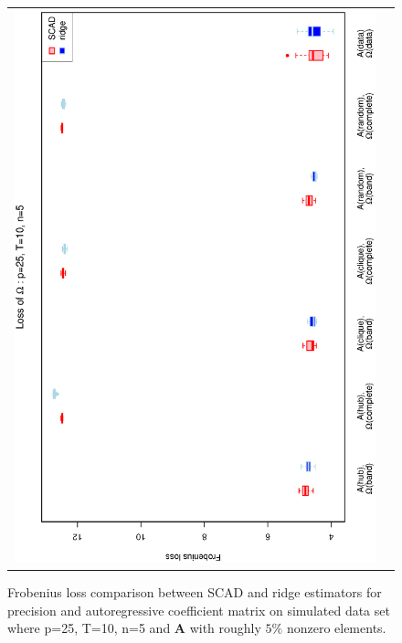 \documentclass[a4paper]{article}
\begin{document}
\begin{figure}[h!]
\begin{tabular}{cc}
\includegraphics[scale=0.45,angle=270]{LossOmega25T10N5_5.eps}
\end{tabular}
\caption{Frobenius loss comparison between SCAD and ridge estimators for precision and autoregressive coefficient matrix on simulated data set where p=25, T=10, n=5 and $\mathbf{A}$ with roughly $5\%$ nonzero elements.}
\label{figSM:Loss25T10N5_5}
\end{figure}

\end{document}
